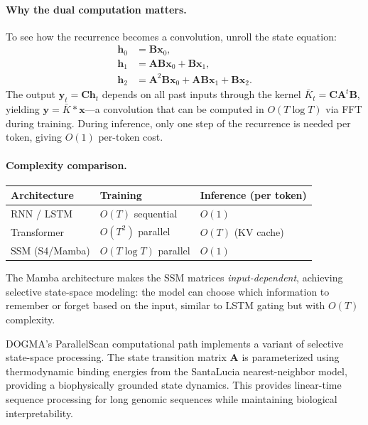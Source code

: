 \paragraph{Why the dual computation matters.} To see how the recurrence becomes a convolution, unroll the state equation:
\begin{align}
\mathbf{h}_0 &= \mathbf{B}\mathbf{x}_0, \\
\mathbf{h}_1 &= \mathbf{A}\mathbf{B}\mathbf{x}_0 + \mathbf{B}\mathbf{x}_1, \\
\mathbf{h}_2 &= \mathbf{A}^2\mathbf{B}\mathbf{x}_0 + \mathbf{A}\mathbf{B}\mathbf{x}_1 + \mathbf{B}\mathbf{x}_2.
\end{align}
The output $\mathbf{y}_t = \mathbf{C}\mathbf{h}_t$ depends on all past inputs through the kernel $\bar{K}_t = \mathbf{C}\mathbf{A}^t\mathbf{B}$, yielding $\mathbf{y} = \bar{K} * \mathbf{x}$---a convolution that can be computed in $O(T \log T)$ via FFT during training. During inference, only one step of the recurrence is needed per token, giving $O(1)$ per-token cost.

\paragraph{Complexity comparison.}
\begin{center}
\renewcommand{\arraystretch}{1.12}
\begin{tabularx}{0.85\textwidth}{L{3.5cm} L{3cm} Y}
\toprule
\textbf{Architecture} & \textbf{Training} & \textbf{Inference (per token)} \\
\midrule
RNN / LSTM & $O(T)$ sequential & $O(1)$ \\
Transformer & $O(T^2)$ parallel & $O(T)$ (KV cache) \\
SSM (S4/Mamba) & $O(T \log T)$ parallel & $O(1)$ \\
\bottomrule
\end{tabularx}
\end{center}

The Mamba architecture \citep{gu2023mamba} makes the SSM matrices \emph{input-dependent}, achieving selective state-space modeling: the model can choose which information to remember or forget based on the input, similar to LSTM gating but with $O(T)$ complexity.

\begin{keyinsight}
DOGMA's ParallelScan computational path implements a variant of selective state-space processing. The state transition matrix $\mathbf{A}$ is parameterized using thermodynamic binding energies from the SantaLucia nearest-neighbor model, providing a biophysically grounded state dynamics. This provides linear-time sequence processing for long genomic sequences while maintaining biological interpretability.
\end{keyinsight}

